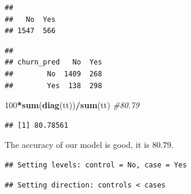 \documentclass[
  twoside]{article}
\newenvironment{Shaded}{\begin{snugshade}}{\end{snugshade}}
\newcommand{\CommentTok}[1]{\textcolor[rgb]{0.56,0.35,0.01}{\textit{#1}}}
\newcommand{\DecValTok}[1]{\textcolor[rgb]{0.00,0.00,0.81}{#1}}
\newcommand{\FunctionTok}[1]{\textcolor[rgb]{0.13,0.29,0.53}{\textbf{#1}}}
\newcommand{\NormalTok}[1]{#1}
\newcommand{\OtherTok}[1]{\textcolor[rgb]{0.56,0.35,0.01}{#1}}
\newcommand{\SpecialCharTok}[1]{\textcolor[rgb]{0.81,0.36,0.00}{\textbf{#1}}}
\begin{document}
\begin{verbatim}
## 
##   No  Yes 
## 1547  566
\end{verbatim}

\begin{Shaded}
\end{Shaded}

\begin{verbatim}
##           
## churn_pred   No  Yes
##        No  1409  268
##        Yes  138  298
\end{verbatim}

\begin{Shaded}
\begin{Highlighting}[]
\DecValTok{100}\SpecialCharTok{*}\FunctionTok{sum}\NormalTok{(}\FunctionTok{diag}\NormalTok{(tt))}\SpecialCharTok{/}\FunctionTok{sum}\NormalTok{(tt) }\CommentTok{\#80.79}
\end{Highlighting}
\end{Shaded}

\begin{verbatim}
## [1] 80.78561
\end{verbatim}

The accuracy of our model is good, it is \(80.79%
\).

\begin{Shaded}
\end{Shaded}

\begin{verbatim}
## Setting levels: control = No, case = Yes
\end{verbatim}

\begin{verbatim}
## Setting direction: controls < cases
\end{verbatim}
\end{document}
